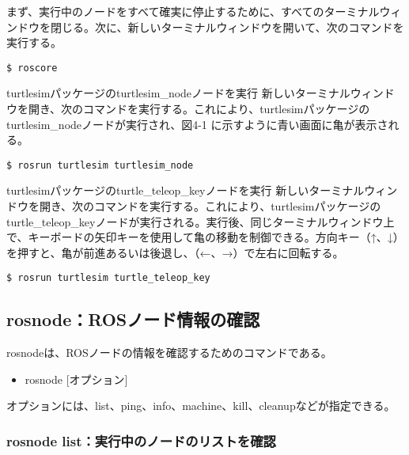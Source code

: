 まず、実行中のノードをすべて確実に停止するために、すべてのターミナルウィンドウを閉じる。次に、新しいターミナルウィンドウを開いて、次のコマンドを実行する。

\begin{lstlisting}[language=ROS]
$ roscore
\end{lstlisting}

turtlesimパッケージのturtlesim\_nodeノードを実行
新しいターミナルウィンドウを開き、次のコマンドを実行する。これにより、turtlesimパッケージのturtlesim\_nodeノードが実行され、図4-1 に示すように青い画面に亀が表示される。

\begin{lstlisting}[language=ROS]
$ rosrun turtlesim turtlesim_node
\end{lstlisting}

turtlesimパッケージのturtle\_teleop\_keyノードを実行
新しいターミナルウィンドウを開き、次のコマンドを実行する。これにより、turtlesimパッケージのturtle\_teleop\_keyノードが実行される。実行後、同じターミナルウィンドウ上で、キーボードの矢印キーを使用して亀の移動を制御できる。方向キー（↑、↓）を押すと、亀が前進あるいは後退し、（←、→）で左右に回転する。

\begin{lstlisting}[language=ROS]
$ rosrun turtlesim turtle_teleop_key
\end{lstlisting}

\subsection{rosnode：ROSノード情報の確認}

rosnodeは、ROSノードの情報を確認するためのコマンドである。

\vspace{\baselineskip}
\begin{itemize}
\item  rosnode [オプション]
\end{itemize}
\vspace{\baselineskip}

オプションには、list、ping、info、machine、kill、cleanupなどが指定できる。\\

\subsubsection{rosnode list：実行中のノードのリストを確認}

